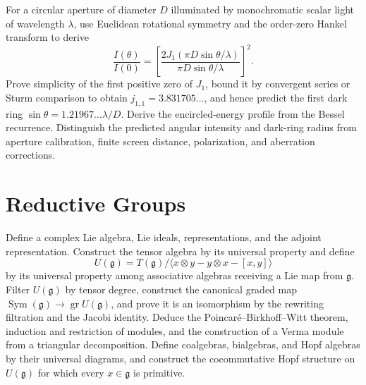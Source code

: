 \begin{exercise}
For a circular aperture of diameter $D$ illuminated by monochromatic scalar
light of wavelength $\lambda$, use Euclidean rotational symmetry and the
order-zero Hankel transform to derive
\[
 \frac{I(\theta)}{I(0)}=
 \left[\frac{2J_1(\pi D\sin\theta/\lambda)}
 {\pi D\sin\theta/\lambda}\right]^2.
\]
Prove simplicity of the first positive zero of $J_1$, bound it by convergent
series or Sturm comparison to obtain $j_{1,1}=3.831705\ldots$, and hence
predict the first dark ring
$\sin\theta=1.21967\ldots\lambda/D$.  Derive the encircled-energy profile
from the Bessel recurrence.  Distinguish the predicted angular intensity and
dark-ring radius from aperture calibration, finite screen distance,
polarization, and aberration corrections.
\end{exercise}

\section{Reductive Groups}

\begin{exercise}
Define a complex Lie algebra, Lie ideals, representations, and the adjoint
representation.  Construct the tensor algebra by its universal property and
define
\[
 U(\mathfrak g)=T(\mathfrak g)/
 \langle x\otimes y-y\otimes x-[x,y]\rangle
\]
by its universal property among associative algebras receiving a Lie map from
$\mathfrak g$.  Filter $U(\mathfrak g)$ by tensor degree, construct the
canonical graded map
$\operatorname{Sym}(\mathfrak g)\to\operatorname{gr}U(\mathfrak g)$, and
prove it is an isomorphism by the rewriting filtration and the Jacobi
identity.  Deduce the Poincar\'e--Birkhoff--Witt theorem, induction and
restriction of modules, and the construction of a Verma module from a
triangular decomposition.  Define coalgebras, bialgebras, and Hopf algebras by
their universal diagrams, and construct the cocommutative Hopf structure on
$U(\mathfrak g)$ for which every $x\in\mathfrak g$ is primitive.
\end{exercise}

